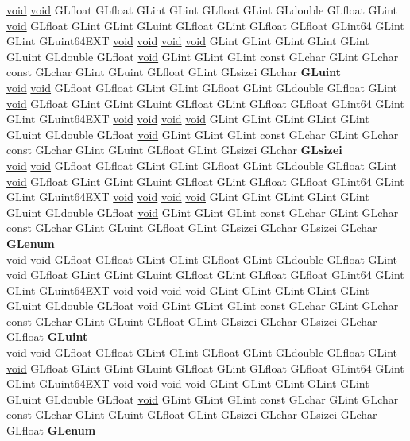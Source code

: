 \begin{DoxyCompactItemize}
\begin{tabbing}
\>\hyperlink{interfacevoid}{void} \hyperlink{interfacevoid}{void} GLfloat GLfloat GLint GLint GLfloat GLint GLdouble GLfloat GLint \hyperlink{interfacevoid}{void} GLfloat GLint GLint GLuint GLfloat GLint GLfloat GLfloat GLint64 GLint GLint GLuint64EXT \hyperlink{interfacevoid}{void} \hyperlink{interfacevoid}{void} \hyperlink{interfacevoid}{void} \hyperlink{interfacevoid}{void} GLint GLint GLint GLint GLint GLuint GLdouble GLfloat \hyperlink{interfacevoid}{void} GLint GLint GLint const GLchar GLint GLchar const GLchar GLint GLuint GLfloat GLint GLsizei GLchar {\bfseries GLuint}\\
\>\hyperlink{interfacevoid}{void} \hyperlink{interfacevoid}{void} GLfloat GLfloat GLint GLint GLfloat GLint GLdouble GLfloat GLint \hyperlink{interfacevoid}{void} GLfloat GLint GLint GLuint GLfloat GLint GLfloat GLfloat GLint64 GLint GLint GLuint64EXT \hyperlink{interfacevoid}{void} \hyperlink{interfacevoid}{void} \hyperlink{interfacevoid}{void} \hyperlink{interfacevoid}{void} GLint GLint GLint GLint GLint GLuint GLdouble GLfloat \hyperlink{interfacevoid}{void} GLint GLint GLint const GLchar GLint GLchar const GLchar GLint GLuint GLfloat GLint GLsizei GLchar {\bfseries GLsizei}\\
\>\hyperlink{interfacevoid}{void} \hyperlink{interfacevoid}{void} GLfloat GLfloat GLint GLint GLfloat GLint GLdouble GLfloat GLint \hyperlink{interfacevoid}{void} GLfloat GLint GLint GLuint GLfloat GLint GLfloat GLfloat GLint64 GLint GLint GLuint64EXT \hyperlink{interfacevoid}{void} \hyperlink{interfacevoid}{void} \hyperlink{interfacevoid}{void} \hyperlink{interfacevoid}{void} GLint GLint GLint GLint GLint GLuint GLdouble GLfloat \hyperlink{interfacevoid}{void} GLint GLint GLint const GLchar GLint GLchar const GLchar GLint GLuint GLfloat GLint GLsizei GLchar GLsizei GLchar {\bfseries GLenum}\\
\>\hyperlink{interfacevoid}{void} \hyperlink{interfacevoid}{void} GLfloat GLfloat GLint GLint GLfloat GLint GLdouble GLfloat GLint \hyperlink{interfacevoid}{void} GLfloat GLint GLint GLuint GLfloat GLint GLfloat GLfloat GLint64 GLint GLint GLuint64EXT \hyperlink{interfacevoid}{void} \hyperlink{interfacevoid}{void} \hyperlink{interfacevoid}{void} \hyperlink{interfacevoid}{void} GLint GLint GLint GLint GLint GLuint GLdouble GLfloat \hyperlink{interfacevoid}{void} GLint GLint GLint const GLchar GLint GLchar const GLchar GLint GLuint GLfloat GLint GLsizei GLchar GLsizei GLchar GLfloat {\bfseries GLuint}\\
\>\hyperlink{interfacevoid}{void} \hyperlink{interfacevoid}{void} GLfloat GLfloat GLint GLint GLfloat GLint GLdouble GLfloat GLint \hyperlink{interfacevoid}{void} GLfloat GLint GLint GLuint GLfloat GLint GLfloat GLfloat GLint64 GLint GLint GLuint64EXT \hyperlink{interfacevoid}{void} \hyperlink{interfacevoid}{void} \hyperlink{interfacevoid}{void} \hyperlink{interfacevoid}{void} GLint GLint GLint GLint GLint GLuint GLdouble GLfloat \hyperlink{interfacevoid}{void} GLint GLint GLint const GLchar GLint GLchar const GLchar GLint GLuint GLfloat GLint GLsizei GLchar GLsizei GLchar GLfloat {\bfseries GLenum}\\

\end{tabbing}
\end{DoxyCompactItemize}
